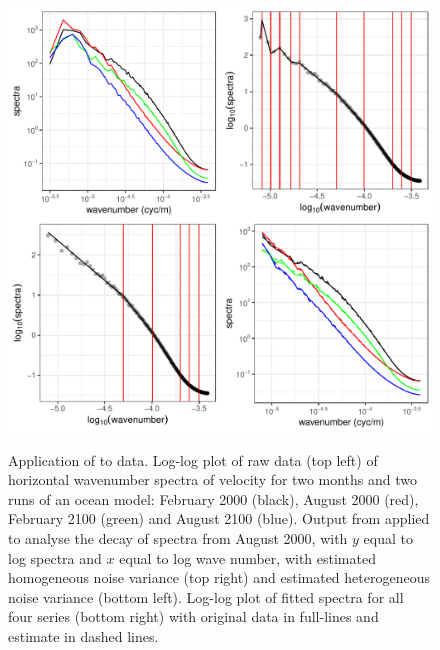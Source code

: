\documentclass[nojss]{jss}
\begin{document}
\begin{figure}
\centering
{\includegraphics{figures/cpop_real_data_ggplot.pdf}}
\caption{Application of  to  data. Log-log plot of raw data (top left) of horizontal wavenumber spectra of velocity for two months and two runs of an ocean model: February 2000 (black), August 2000 (red), February 2100 (green) and August 2100 (blue). Output from  applied to analyse the decay of spectra from August 2000, with $y$ equal to log spectra and $x$ equal to log wave number, with estimated homogeneous noise variance (top right) and estimated heterogeneous noise variance (bottom left). Log-log plot of fitted spectra for all four series (bottom right) with original data in full-lines and estimate in dashed lines. 
}
\label{fig:crops.data}
\end{figure}
\end{document}
